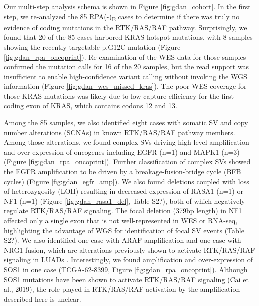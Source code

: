 \documentclass[phd,tocprelim]{cornell}
\begin{document}
Our multi-step analysis schema is shown in Figure \ref{fig:gdan_cohort}. In the first step, we re-analyzed the 85 RPA(-)\textsubscript{E} cases to determine if there was truly no evidence of coding mutations in the RTK/RAS/RAF pathway. Surprisingly, we found that 20 of the 85 cases harbored KRAS hotspot mutations, with 8 samples showing the recently targetable p.G12C mutation \cite{Canon2019-aj,Ostrem2013-lt} (Figure \ref{fig:gdan_rpa_oncoprint}). Re-examination of the WES data for those samples confirmed the mutation calls for 16 of the 20 samples, but the read support was insufficient to enable high-confidence variant calling without invoking the WGS information (Figure \ref{fig:gdan_wes_missed_kras}). The poor WES coverage for those KRAS mutations was likely due to low capture efficiency \cite{Clark2011-iq} for the first coding exon of KRAS, which contains codons 12 and 13. 

Among the 85 samples, we also identified eight cases with somatic SV and copy number alterations (SCNAs) in known RTK/RAS/RAF pathway members. Among those alterations, we found complex SVs driving high-level amplification and over-expression of oncogenes including EGFR (n=1) and MAPK1 (n=3) (Figure \ref{fig:gdan_rpa_oncoprint}). Further classification of complex SVs showed the EGFR amplification to be driven by a breakage-fusion-bridge cycle (BFB cycles) (Figure \ref{fig:gdan_egfr_amp}). We also found deletions coupled with loss of heterozygosity (LOH) resulting in decreased expression of RASA1 (n=1) or NF1 (n=1) (Figure \ref{fig:gdan_rasa1_del}, Table S2?), both of which negatively regulate RTK/RAS/RAF signaling. The focal deletion (379bp length) in NF1 affected only a single exon that is not well-represented in WES or RNA-seq, highlighting the advantage of WGS for identification of focal SV events (Table S2?). We also identified one case with ARAF amplification and one case with NRG1 fusion, which are alterations previously shown to activate RTK/RAS/RAF signaling in LUADs \cite{Fernandez-Cuesta2014-wr,Imielinski2014-ve}. Interestingly, we found amplification and over-expression of SOS1 in one case (TCGA-62-8399, Figure \ref{fig:gdan_rpa_oncoprint}). Although SOS1 mutations have been shown to activate RTK/RAS/RAF signaling (Cai et al., 2019), the role played in RTK/RAS/RAF activation by the amplification described here is unclear.
\end{document}
